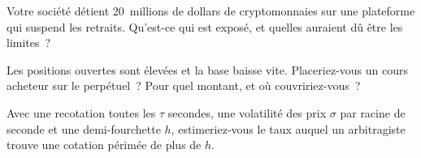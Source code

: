 \begin{interviewq}\label{iq:hf:crypto-high-frequency-trading-on-centralised-venues:4}
Votre société détient 20~millions de dollars de cryptomonnaies sur une plateforme qui suspend les retraits. Qu'est-ce qui est exposé, et quelles auraient dû être les limites~?
\end{interviewq}

\begin{interviewq}\label{iq:hf:crypto-high-frequency-trading-on-centralised-venues:5}
Les positions ouvertes sont élevées et la base baisse vite. Placeriez-vous un cours acheteur sur le perpétuel~? Pour quel montant, et où couvririez-vous~?
\end{interviewq}

\begin{interviewq}\label{iq:hf:crypto-high-frequency-trading-on-centralised-venues:6}
Avec une recotation toutes les $\tau$ secondes, une volatilité des prix $\sigma$ par racine de seconde et une demi-fourchette $h$, estimeriez-vous le taux
auquel un arbitragiste trouve une cotation périmée de plus de $h$.
\end{interviewq}
